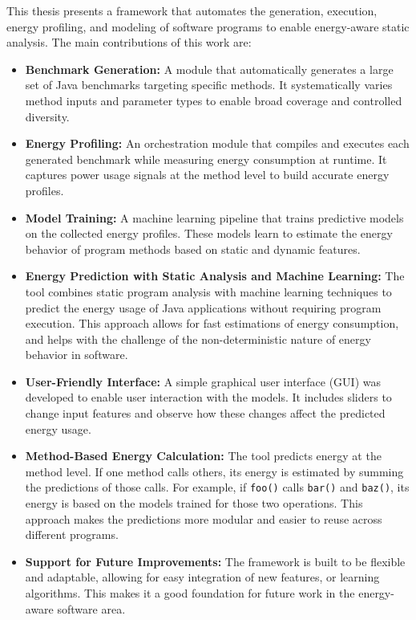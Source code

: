 This thesis presents a framework that automates the generation, execution, energy profiling, and modeling of software programs to enable energy-aware static analysis. The main contributions of this work are:

\begin{itemize}
    \item \textbf{Benchmark Generation:} A module that automatically generates a large set of Java benchmarks targeting specific methods. It systematically varies method inputs and parameter types to enable broad coverage and controlled diversity.

    \item \textbf{Energy Profiling:} An orchestration module that compiles and executes each generated benchmark while measuring energy consumption at runtime. It captures power usage signals at the method level to build accurate energy profiles.

    \item \textbf{Model Training:} A machine learning pipeline that trains predictive models on the collected energy profiles. These models learn to estimate the energy behavior of program methods based on static and dynamic features.
    
    \item \textbf{Energy Prediction with Static Analysis and Machine Learning:} The tool combines static program analysis with machine learning techniques to predict the energy usage of Java applications without requiring program execution. This approach allows for fast estimations of energy consumption, and helps with the challenge of the non-deterministic nature of energy behavior in software.

    \item \textbf{User-Friendly Interface:} A simple graphical user interface (GUI) was developed to enable user interaction with the models. It includes sliders to change input features and observe how these changes affect the predicted energy usage.
    
    \item \textbf{Method-Based Energy Calculation:} The tool predicts energy at the method level. If one method calls others, its energy is estimated by summing the predictions of those calls. For example, if \texttt{foo()} calls \texttt{bar()} and \texttt{baz()}, its energy is based on the models trained for those two operations. This approach makes the predictions more modular and easier to reuse across different programs.

    \item \textbf{Support for Future Improvements:} The framework is built to be flexible and adaptable, allowing for easy integration of new features, or learning algorithms. This makes it a good foundation for future work in the energy-aware software area.
\end{itemize}




